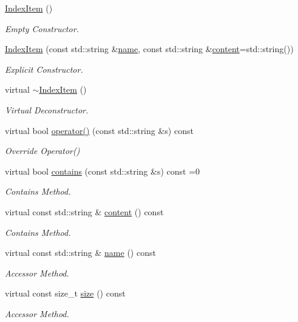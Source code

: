\begin{DoxyCompactItemize}
\item 
\mbox{\label{class_index_item_aa37a5377a9cdd5993b09baad3d842a6f}} 
\hyperlink{class_index_item_aa37a5377a9cdd5993b09baad3d842a6f}{Index\+Item} ()
\begin{DoxyCompactList}\small\item\em Empty Constructor. \end{DoxyCompactList}\item 
\hyperlink{class_index_item_a9fcaaa46fb93a873ad73dc1ebdec8163}{Index\+Item} (const std\+::string \&\hyperlink{class_index_item_a059cbae312c51ae7d02050f8f325bf93}{name}, const std\+::string \&\hyperlink{class_index_item_a2b5b4451bcb2fd50328bdc5b470d6296}{content}=std\+::string())
\begin{DoxyCompactList}\small\item\em Explicit Constructor. \end{DoxyCompactList}\item 
\mbox{\label{class_index_item_a38ee85d9f855b56d7bc591e3b3555f4c}} 
virtual \hyperlink{class_index_item_a38ee85d9f855b56d7bc591e3b3555f4c}{$\sim$\+Index\+Item} ()
\begin{DoxyCompactList}\small\item\em Virtual Deconstructor. \end{DoxyCompactList}\item 
virtual bool \hyperlink{class_index_item_a38ccc46639b8d0b066024bad728c1bfa}{operator()} (const std\+::string \&s) const
\begin{DoxyCompactList}\small\item\em Override Operator() \end{DoxyCompactList}\item 
virtual bool \hyperlink{class_index_item_a534d96bf041a485ed124663b9cded2fb}{contains} (const std\+::string \&s) const =0
\begin{DoxyCompactList}\small\item\em Contains Method. \end{DoxyCompactList}\item 
virtual const std\+::string \& \hyperlink{class_index_item_a2b5b4451bcb2fd50328bdc5b470d6296}{content} () const
\begin{DoxyCompactList}\small\item\em Contains Method. \end{DoxyCompactList}\item 
virtual const std\+::string \& \hyperlink{class_index_item_a059cbae312c51ae7d02050f8f325bf93}{name} () const
\begin{DoxyCompactList}\small\item\em Accessor Method. \end{DoxyCompactList}\item 
virtual const size\+\_\+t \hyperlink{class_index_item_aa910a42ef4f6d7087297ac7fb8cf4a6c}{size} () const
\begin{DoxyCompactList}\small\item\em Accessor Method. \end{DoxyCompactList}\end{DoxyCompactItemize}

